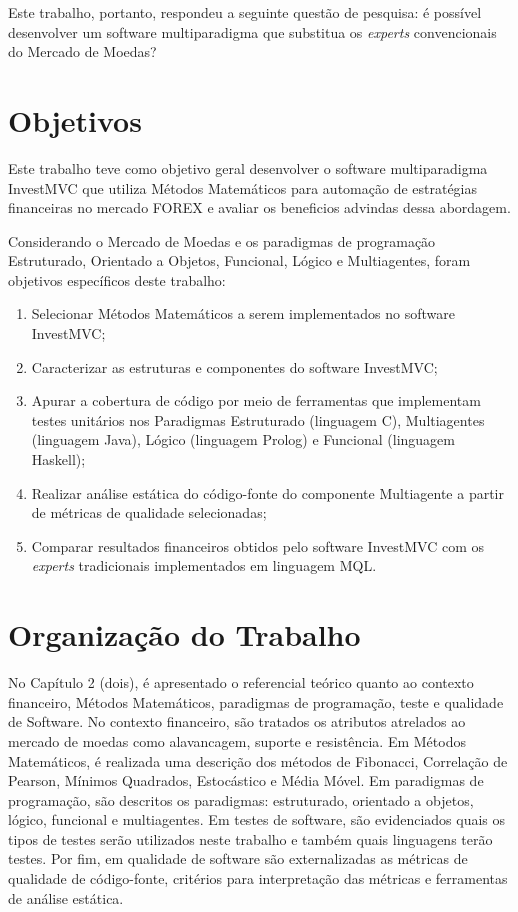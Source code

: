 Este trabalho, portanto, respondeu a seguinte questão de pesquisa: é possível desenvolver um software multiparadigma que substitua os \textit{experts} convencionais do Mercado de Moedas?

\section{Objetivos}
Este trabalho teve como objetivo geral desenvolver o software multiparadigma InvestMVC que utiliza Métodos Matemáticos para automação de estratégias financeiras no mercado FOREX e avaliar os beneficios advindas dessa abordagem.

Considerando o Mercado de Moedas e os paradigmas de programação Estruturado, Orientado a Objetos, Funcional, Lógico e Multiagentes, foram objetivos específicos deste trabalho:

\begin{enumerate}
\item  Selecionar Métodos Matemáticos a serem implementados no software InvestMVC;

\item Caracterizar as estruturas e componentes do software InvestMVC;

\item Apurar a cobertura de código por meio de ferramentas que implementam testes unitários nos Paradigmas Estruturado (linguagem C), Multiagentes (linguagem Java), Lógico (linguagem Prolog) e Funcional (linguagem Haskell);

\item  Realizar análise estática do código-fonte do componente Multiagente a partir de métricas de qualidade selecionadas;

\item Comparar resultados financeiros obtidos pelo software InvestMVC com os \textit{experts} tradicionais implementados em linguagem MQL.
\end{enumerate}

\section{Organização do Trabalho}
No Capítulo 2 (dois), é apresentado o referencial teórico quanto ao contexto financeiro, Métodos Matemáticos, paradigmas de programação, teste e qualidade de Software. No contexto financeiro, são tratados os atributos atrelados ao mercado de moedas como alavancagem, suporte e resistência. Em Métodos Matemáticos, é realizada uma descrição dos métodos de Fibonacci, Correlação de Pearson, Mínimos Quadrados, Estocástico e Média Móvel. Em paradigmas de programação, são descritos os paradigmas: estruturado, orientado a objetos, lógico, funcional e multiagentes. Em testes de software, são evidenciados quais os tipos de testes serão utilizados neste trabalho e também quais linguagens terão testes. Por fim, em qualidade de software são externalizadas as métricas de qualidade de código-fonte, critérios para interpretação das métricas e ferramentas de análise estática.

